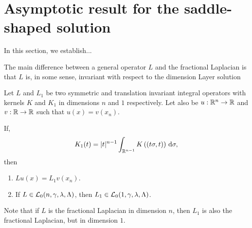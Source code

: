 \section{Asymptotic result for the saddle-shaped solution}
\label{Sec:Asymptotic}

In this section, we establish...


The main difference between a general operator $L$ and the fractional Laplacian is that $L$ is, in some sense, invariant with respect to the dimension 
Layer solution


\begin{proposition}
	\label{Prop:KernelsDimension}
	Let $L$ and $L_1$ be two symmetric and translation invariant integral operators with kernels $K$ and $K_1$ in dimensions $n$ and $1$ respectively. Let also be $u:\mathbb{R}^n\to\mathbb{R}$ and $v:\mathbb{R}\to\mathbb{R}$ such that $u(x) = v(x_n)$.
	
	If,
	$$ K_1(t) = |t|^{n-1} \int_{\mathbb{R}^{n-1}} K\left((t\sigma,t)\right) \,\mathrm{d} \sigma, $$
	then
	\begin{enumerate}[label=(\roman{*})]
		\item $Lu(x) = L_1 v(x_n)$.
		\item If $L\in \mathcal{L}_0 (n,\gamma,\lambda,\Lambda)$, then   $L_1 \in \mathcal{L}_0 (1,\gamma,\lambda,\Lambda)$.
	\end{enumerate}
\end{proposition}

Note that if $L$ is the fractional Laplacian in dimension $n$, then $L_1$ is also the fractional Laplacian, but in dimension $1$.

